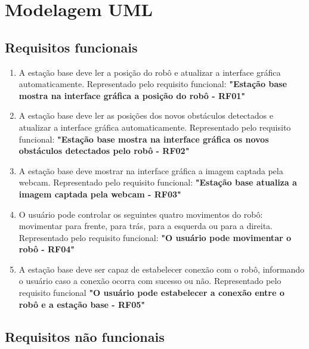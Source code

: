 \chapter{Modelagem UML}

\section{Requisitos funcionais}

\begin{enumerate}[topsep=0pt, partopsep=0pt, itemsep=0pt]
  \item A estação base deve ler a posição do robô e atualizar a interface gráfica automaticamente. Representado pelo requisito funcional: \textbf{"Estação base mostra na interface gráfica a posição do robô - RF01"}
  \item A estação base deve ler as posições dos novos obstáculos detectados e atualizar a interface gráfica automaticamente. Representado pelo requisito funcional: \textbf{"Estação base mostra na interface gráfica os novos obstáculos detectados pelo robô - RF02"}
  \item A estação base deve mostrar na interface gráfica a imagem captada pela webcam. Representado pelo requisito funcional: \textbf{"Estação base atualiza a imagem captada pela webcam - RF03"}
  \item O usuário pode controlar os seguintes quatro movimentos do robô: movimentar para frente, para trás, para a esquerda ou para a direita. Representado pelo requisito funcional: \textbf{"O usuário pode movimentar o robô - RF04"}
  \item A estação base deve ser capaz de estabelecer conexão com o robô, informando o usuário caso a conexão ocorra com sucesso ou não. Representado pelo requisito funcional \textbf{"O usuário pode estabelecer a conexão entre o robô e a estação base - RF05"}
\end{enumerate}

\section{Requisitos não funcionais}

